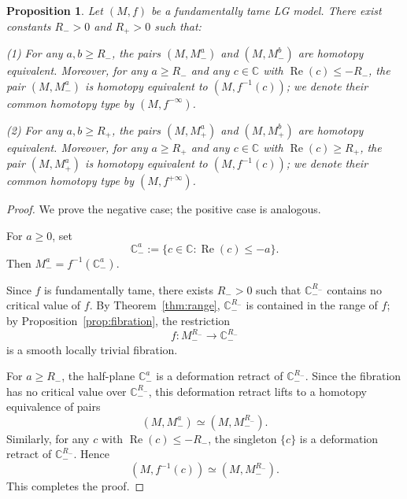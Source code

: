 \documentclass[11pt]{amsart}
\theoremstyle{plain}
\newtheorem{proposition}[theorem]{Proposition}
\theoremstyle{definition}
\theoremstyle{remark}
\numberwithin{equation}{section}
\begin{document}
\begin{proposition}\label{prop:homotopy}
    Let $(M, f)$ be a fundamentally tame LG model.
    There exist constants $R_{-} > 0$ and $R_{+} > 0$ such that:

    (1) For any $a, b \ge R_{-}$, the pairs $(M, M_{-}^{a})$ and $(M, M_{-}^{b})$ are homotopy equivalent.
    Moreover, for any $a \ge R_{-}$ and any $c \in \mathbb{C}$ with $\operatorname{Re}(c) \le -R_{-}$, the pair $(M, M_{-}^{a})$ is homotopy equivalent to $(M, f^{-1}(c))$; we denote their common homotopy type by $(M, f^{-\infty})$.

    (2) For any $a, b \ge R_{+}$, the pairs $(M, M_{+}^{a})$ and $(M, M_{+}^{b})$ are homotopy equivalent.
    Moreover, for any $a \ge R_{+}$ and any $c \in \mathbb{C}$ with $\operatorname{Re}(c) \ge R_{+}$, the pair $(M, M_{+}^{a})$ is homotopy equivalent to $(M, f^{-1}(c))$; we denote their common homotopy type by $(M, f^{+\infty})$.
\end{proposition}

\begin{proof}
    We prove the negative case; the positive case is analogous.

    For $a \ge 0$, set
    \begin{equation}
        \mathbb{C}_{-}^{a} := \{c \in \mathbb{C} : \operatorname{Re}(c) \le -a\}.
    \end{equation}
    Then $M_{-}^{a} = f^{-1}(\mathbb{C}_{-}^{a})$.

    Since $f$ is fundamentally tame, there exists $R_{-} > 0$ such that $\mathbb{C}_{-}^{R_{-}}$ contains no critical value of $f$.
    By Theorem~\ref{thm:range}, $\mathbb{C}_{-}^{R_{-}}$ is contained in the range of $f$; by Proposition~\ref{prop:fibration}, the restriction
    \begin{equation}
        f : M_{-}^{R_{-}} \to \mathbb{C}_{-}^{R_{-}}
    \end{equation}
    is a smooth locally trivial fibration.

    For $a \ge R_{-}$, the half-plane $\mathbb{C}_{-}^{a}$ is a deformation retract of $\mathbb{C}_{-}^{R_{-}}$.
    Since the fibration has no critical value over $\mathbb{C}_{-}^{R_{-}}$, this deformation retract lifts to a homotopy equivalence of pairs
    \begin{equation}
        (M, M_{-}^{a}) \simeq (M, M_{-}^{R_{-}}).
    \end{equation}
    Similarly, for any $c$ with $\operatorname{Re}(c) \le -R_{-}$, the singleton $\{c\}$ is a deformation retract of $\mathbb{C}_{-}^{R_{-}}$.
    Hence
    \begin{equation}
        (M, f^{-1}(c)) \simeq (M, M_{-}^{R_{-}}).
    \end{equation}
    This completes the proof.
\end{proof}
\end{document}

